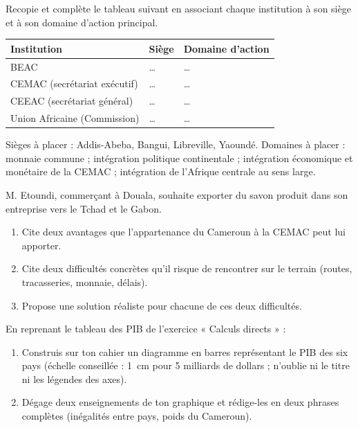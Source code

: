 \documentclass[11pt]{article}
\begin{document}
\begin{exercice}
Recopie et complète le tableau suivant en associant chaque institution à son siège et à son domaine d'action principal.

\begin{center}
\begin{tabularx}{\linewidth}{|l|X|X|}\hline
\rowcolor{popblueL} \textbf{Institution} & \textbf{Siège} & \textbf{Domaine d'action} \\ \hline
BEAC & \ldots & \ldots \\ \hline
CEMAC (secrétariat exécutif) & \ldots & \ldots \\ \hline
CEEAC (secrétariat général) & \ldots & \ldots \\ \hline
Union Africaine (Commission) & \ldots & \ldots \\ \hline
\end{tabularx}
\end{center}

Sièges à placer : Addis-Abeba, Bangui, Libreville, Yaoundé. Domaines à placer : monnaie commune ; intégration politique continentale ; intégration économique et monétaire de la CEMAC ; intégration de l'Afrique centrale au sens large.
\end{exercice}

\begin{exercice}
M. Etoundi, commerçant à Douala, souhaite exporter du savon produit dans son entreprise vers le Tchad et le Gabon.
\begin{enumerate}
\item Cite deux avantages que l'appartenance du Cameroun à la CEMAC peut lui apporter.
\item Cite deux difficultés concrètes qu'il risque de rencontrer sur le terrain (routes, tracasseries, monnaie, délais).
\item Propose une solution réaliste pour chacune de ces deux difficultés.
\end{enumerate}
\end{exercice}

\begin{exercice}
En reprenant le tableau des PIB de l'exercice « Calculs directs » :
\begin{enumerate}
\item Construis sur ton cahier un diagramme en barres représentant le PIB des six pays (échelle conseillée : \SI{1}{cm} pour 5 milliards de dollars ; n'oublie ni le titre ni les légendes des axes).
\item Dégage deux enseignements de ton graphique et rédige-les en deux phrases complètes (inégalités entre pays, poids du Cameroun).
\end{enumerate}
\end{exercice}
\end{document}
